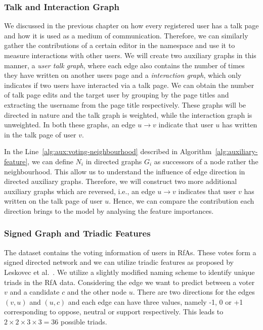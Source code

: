 \subsubsection{Talk and Interaction Graph}
We discussed in the previous chapter on how every registered user has a talk page and how it is used as a medium of communication. 
Therefore, we can similarly gather the contributions of a certain editor in the \usertalkNS namespace and use it to measure interactions with other users.
We will create two auxiliary graphs in this manner, a \textit{user talk graph}, where each edge also contains the number of times they have written on another users page and a \textit{interaction graph}, which only indicates if two users have interacted via a talk page. 
We can obtain the number of talk page edits and the target user by grouping by the page titles and extracting the username from the page title respectively. 
These graphs will be directed in nature and the talk graph is weighted, while the interaction graph is unweighted. 
In both these graphs, an edge $u \rightarrow v$ indicate that user $u$ has written in the talk page of user $v$.

In the Line~\ref{alg:aux:voting-neighbourhood} described in Algorithm~\ref{alg:auxiliary-feature}, we can define $N_i$ in directed graphs $G_i$ as successors of a node rather the neighbourhood.
This allow us to understand the influence of edge direction in directed auxiliary graphs.
Therefore, we will construct two more additional auxiliary graphs which are reversed, i.e., an edge $u \rightarrow v$ indicates that user $v$ has written on the talk page of user $u$.
Hence, we can compare the contribution each direction brings to the model by analysing the feature importances.

\subsubsection{Signed Graph and Triadic Features}
The \wikirfa dataset contains the voting information of users in RfAs.
These votes form a signed directed network and we can utilize triadic features as proposed by Leskovec et al.\ \cite{leskovec2010predicting}.
We utilize a slightly modified naming scheme to identify unique triads in the RfA data.
Considering the edge we want to predict between a voter $v$ and a candidate $c$ and the other node $u$.
There are two directions for the edges $(v,u)$ and $(u,c)$ and each edge can have three values, namely -1, 0 or +1 corresponding to oppose, neutral or support respectively.
This leads to $2 \times 2 \times 3 \times 3 = 36$ possible triads.


